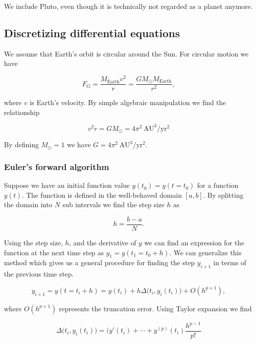 \documentclass[a4paper, fontsize=11pt]{article}
\begin{document}
We include Pluto, even though it is technically not regarded as a planet anymore. 

\subsection{Discretizing differential equations}
We assume that Earth's orbit is circular around the Sun. For circular motion we have

\begin{equation}
F_{G} = \dfrac{M_{\text{Earth}}v^2}{r}=\dfrac{GM_{\odot} M_{\text{Earth}}}{r^2},
\end{equation}

where $v$ is Earth's velocity. By simple algebraic manipulation we find the relationship

\begin{equation}
v^2 r = G M_{\odot}=4 \pi^2 \: \text{AU}^3/\text{yr}^2
\end{equation}

By defining $M_{\odot} = 1$ we have $G=4\pi^2 \: \text{AU}^3/\text{yr}^2$.



\subsubsection{Euler's forward algorithm}
Suppose we have an initial function value $y(t_{0})=y(t=t_{0})$ for a function $y(t)$. The function is defined in the well-behaved domain $[a, b]$. By splitting the domain into $N$ sub intervals we find the step size $h$ as

\begin{equation}
h=\dfrac{b-a}{N}.
\end{equation}

Using the step size, $h$, and the derivative of $y$ we can find an expression for the function at the next time step as $y_{1}=y(t_{1}=t_{0}+h)$. We can generalize this method which gives us a general procedure for finding the step $y_{i+1}$ in terms of the previous time step.

\begin{equation}
y_{i+1}=y(t=t_{i}+h)=y(t_{i})+h \Delta \big(t_{i},y_{i}(t_{i}) \big) + O(h^{p+1}),
\end{equation}

where $O(h^{p+1})$ represents the truncation error. Using Taylor expansion we find 

\begin{equation}
\Delta \big(t_{i}, y_{i}(t_{i}) \big) =(y'(t_{i}) + \cdots + y^{(p)}(t_{i})\dfrac{h^{p-1}}{p!}
\end{equation}
\end{document}
